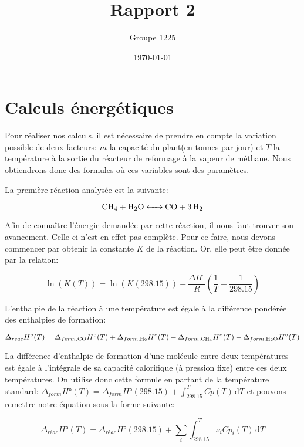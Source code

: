 \documentclass[a4paper, oneside, 12pt]{article}
\title{Rapport 2}
\author{Groupe 1225}
\date{\today}
\begin{document}
\maketitle


\section{Calculs énergétiques}

Pour réaliser nos calculs, il est nécessaire de prendre 
en compte la variation possible de 
deux facteurs: $m$ la capacité du plant(en tonnes par jour) 
et $T$ la température à la sortie du
réacteur de reformage à la vapeur de méthane.
Nous obtiendrons donc des formules où ces variables sont des paramètres.

La première réaction analysée est la suivante:

\begin{equation*}
	\ce{CH4 + H2O <-> CO + 3H2}
\end{equation*}

Afin de connaître l'énergie demandée par cette réaction,
il nous faut trouver son avancement. Celle-ci n'est en effet pas complète.
Pour ce faire, nous devons commencer par obtenir la constante $K$ 
de la réaction. Or, elle peut être donnée par la relation:

\begin{equation}
	\ln{(K(T))} = \ln{(K(298.15))} - 
	\frac{\Delta H^{\circ}}{R}(\frac{1}{T} - \frac{1}{298.15})
\end{equation}

L'enthalpie de la réaction à une température est égale 
à la différence pondérée des enthalpies de formation:

\begin{equation}
	\Delta_{reac} H^{\circ} (T)= \Delta_{form,\ce{CO}} H^{\circ}(T)
	+\Delta_{form, \ce{H2}} H^{\circ} (T) - \Delta_{form, \ce{CH4}} H^{\circ} (T) 
	-\Delta_{form, \ce{H2O}} H^{\circ} (T)
\end{equation}

La différence d'enthalpie de formation d'une molécule entre deux 
températures est égale à l'intégrale de sa capacité calorifique 
(à pression fixe) entre ces deux températures.
On utilise donc cette formule en partant de la  température 
standard: $\Delta_{form}H°(T)= \Delta_{form}H°(298.15)+\int_298.15^T Cp(T) \, \mathrm dT$ et pouvons 
remettre notre équation sous la forme suivante:

\begin{equation}
	\Delta_{réac}H°(T)=\Delta_{réac}H°(298.15)+\sum_i \int_{298.15}^T \nu_i Cp_i(T) \, \mathrm dT
\end{equation}
\end{document}
